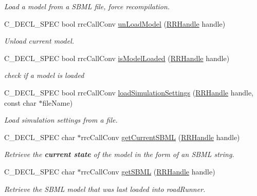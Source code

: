 \begin{DoxyCompactItemize}
\begin{DoxyCompactList}\small\item\em Load a model from a S\-B\-M\-L file, force recompilation. \end{DoxyCompactList}\item 
C\-\_\-\-D\-E\-C\-L\-\_\-\-S\-P\-E\-C bool rrc\-Call\-Conv \hyperlink{group__loadsave_ga53d8e3b97611797889b64601ec878559}{un\-Load\-Model} (\hyperlink{rrc__types_8h_a1d68f0592372208fa5a5f2799ea4b3ae}{R\-R\-Handle} handle)
\begin{DoxyCompactList}\small\item\em Unload current model. \end{DoxyCompactList}\item 
C\-\_\-\-D\-E\-C\-L\-\_\-\-S\-P\-E\-C bool rrc\-Call\-Conv \hyperlink{group__loadsave_ga1522e7efbb34bc40fd88376327a9535d}{is\-Model\-Loaded} (\hyperlink{rrc__types_8h_a1d68f0592372208fa5a5f2799ea4b3ae}{R\-R\-Handle} handle)
\begin{DoxyCompactList}\small\item\em check if a model is loaded \end{DoxyCompactList}\item 
C\-\_\-\-D\-E\-C\-L\-\_\-\-S\-P\-E\-C bool rrc\-Call\-Conv \hyperlink{group__loadsave_ga387b0694ce78f6f82e089cfade9faef8}{load\-Simulation\-Settings} (\hyperlink{rrc__types_8h_a1d68f0592372208fa5a5f2799ea4b3ae}{R\-R\-Handle} handle, const char $\ast$file\-Name)
\begin{DoxyCompactList}\small\item\em Load simulation settings from a file. \end{DoxyCompactList}\item 
C\-\_\-\-D\-E\-C\-L\-\_\-\-S\-P\-E\-C char $\ast$rrc\-Call\-Conv \hyperlink{group__loadsave_gacc85b81616a8a3cee83ce6b2913e6382}{get\-Current\-S\-B\-M\-L} (\hyperlink{rrc__types_8h_a1d68f0592372208fa5a5f2799ea4b3ae}{R\-R\-Handle} handle)
\begin{DoxyCompactList}\small\item\em Retrieve the {\bfseries current state} of the model in the form of an S\-B\-M\-L string. \end{DoxyCompactList}\item 
C\-\_\-\-D\-E\-C\-L\-\_\-\-S\-P\-E\-C char $\ast$rrc\-Call\-Conv \hyperlink{group__loadsave_ga583d80e8a54f0d41b8600bb4ece0e552}{get\-S\-B\-M\-L} (\hyperlink{rrc__types_8h_a1d68f0592372208fa5a5f2799ea4b3ae}{R\-R\-Handle} handle)
\begin{DoxyCompactList}\small\item\em Retrieve the S\-B\-M\-L model that was last loaded into road\-Runner. \end{DoxyCompactList}\end{DoxyCompactItemize}



